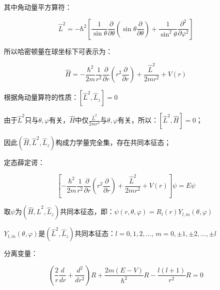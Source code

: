 其中角动量平方算符：

\begin{equation}\label{15-4}
\widehat L^2  =  - \hbar ^2 \left[ {\frac{1}{{\sin \theta }}\frac{\partial }{{\partial \theta }}\left( {\sin \theta \frac{\partial }{{\partial \theta }}} \right) + \frac{1}{{\sin ^2 \theta }}\frac{{\partial ^2 }}{{\partial \varphi ^2 }}} \right]
\end{equation}

所以哈密顿量在球坐标下可表示为：

\begin{equation}\label{15-5}
\widehat H =  - \frac{{\hbar ^2 }}{{2m}}\frac{1}{{r^2 }}\frac{\partial }{{\partial r}}\left( {r^2 \frac{\partial }{{\partial r}}} \right) + \frac{{\widehat L^2 }}{{2mr^2 }} + V(r)
\end{equation}

根据角动量算符的性质：$\left[ {\widehat L^2 ,\widehat L_z } \right] = 0$

由于$\widehat L^2 $只与$\theta ,\varphi $有关，$\hat H$中仅$\frac{{\widehat L^2 }}{{2mr^2 }}$与$\theta ,\varphi $有关，所以：$\left[ {\widehat L^2 ,\widehat H} \right] = 0$；

因此$\left( {\widehat H,\widehat L^2 ,\widehat L_z } \right)$构成力学量完全集，存在共同本征态；


定态薛定谔：

\begin{equation}\label{15-6}
\left[ { - \frac{{\hbar ^2 }}{{2m}}\frac{1}{{r^2 }}\frac{\partial }{{\partial r}}\left( {r^2 \frac{\partial }{{\partial r}}} \right) + \frac{{\widehat L^2 }}{{2mr^2 }} + V(r)} \right]\psi  = E\psi
\end{equation}

取$\psi$为$\left( {\widehat H,\widehat L^2 ,\widehat L_z } \right)$共同本征态，即：$\psi \left( {r,\theta ,\varphi } \right) = R_l \left( r \right)Y_{l,m} \left( {\theta ,\varphi } \right)$

$Y_{l,m} \left( {\theta ,\varphi } \right)$是$\left( {\widehat L^2 ,\widehat L_z } \right)$共同本征态：$l = 0,1,2,...$, $m = 0, \pm 1, \pm 2,..., \pm l$

分离变量：


\begin{equation}\label{15-7}
\left( {\frac{2}{r}\frac{d}{{dr}} + \frac{{d^2 }}{{dr^2 }}} \right)R + \frac{{2m\left( {E - V} \right)}}{{\hbar ^2 }}R - \frac{{l\left( {l + 1} \right)}}{{r^2 }}R = 0
\end{equation}

